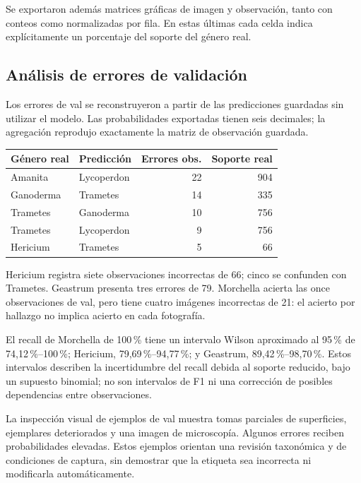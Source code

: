 \documentclass[11pt,a4paper]{article}
\begin{document}
Se exportaron además matrices gráficas de imagen y observación, tanto
con conteos como normalizadas por fila. En estas últimas cada celda
indica explícitamente un porcentaje del soporte del género real.

\subsection{Análisis de errores de validación}

Los errores de val se reconstruyeron a partir de las predicciones guardadas
sin utilizar el modelo. Las probabilidades exportadas tienen seis decimales;
la agregación reprodujo exactamente la matriz de observación guardada.

\begin{center}\small\begin{tabular}{llrr}\toprule
\textbf{Género real} & \textbf{Predicción} & \textbf{Errores obs.} & \textbf{Soporte real}\\\midrule
Amanita & Lycoperdon & 22 & 904\\
Ganoderma & Trametes & 14 & 335\\
Trametes & Ganoderma & 10 & 756\\
Trametes & Lycoperdon & 9 & 756\\
Hericium & Trametes & 5 & 66\\
\bottomrule\end{tabular}\end{center}

Hericium registra siete observaciones incorrectas de 66; cinco se
confunden con Trametes. Geastrum presenta tres errores de 79. Morchella
acierta las once observaciones de val, pero tiene cuatro imágenes
incorrectas de 21: el acierto por hallazgo no implica acierto en cada fotografía.

El recall de Morchella de 100\,\% tiene un intervalo Wilson aproximado
al 95\,\% de 74,12\,\%--100\,\%; Hericium, 79,69\,\%--94,77\,\%;
y Geastrum, 89,42\,\%--98,70\,\%. Estos intervalos describen la incertidumbre
del recall debida al soporte reducido, bajo un supuesto binomial; no son
intervalos de F1 ni una corrección de posibles dependencias entre observaciones.

La inspección visual de ejemplos de val muestra tomas parciales de
superficies, ejemplares deteriorados y una imagen de microscopía. Algunos
errores reciben probabilidades elevadas. Estos ejemplos orientan una
revisión taxonómica y de condiciones de captura, sin demostrar que la
etiqueta sea incorrecta ni modificarla automáticamente.
\end{document}
